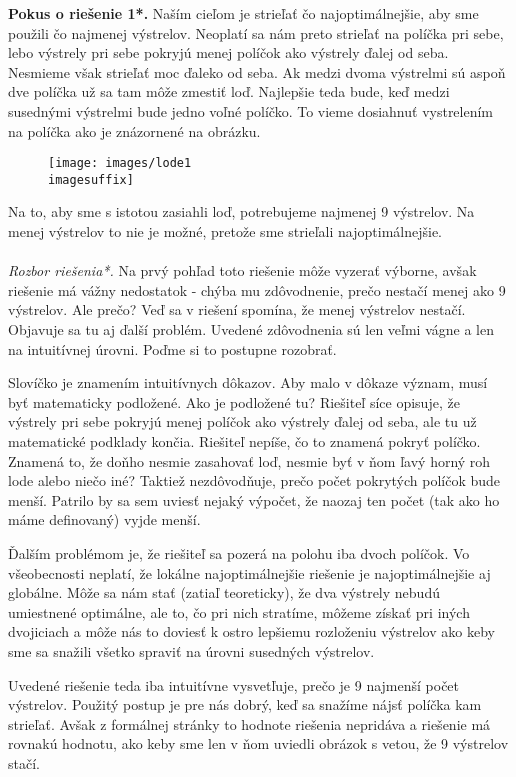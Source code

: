 {\rie
\textbf{Pokus o riešenie 1*.}
Naším cieľom je strieľať čo najoptimálnejšie, aby sme použili čo najmenej výstrelov. Neoplatí sa nám preto strieľať na políčka pri sebe, lebo výstrely pri sebe pokryjú menej políčok ako výstrely ďalej od seba. Nesmieme však strieľať moc ďaleko od seba. Ak medzi dvoma výstrelmi sú aspoň dve políčka už sa tam môže zmestiť loď. Najlepšie teda bude, keď medzi susednými výstrelmi bude jedno voľné políčko. To vieme dosiahnuť vystrelením na políčka ako je znázornené na obrázku.
\begin{figure}[h]
    \centering
    \texttt{[image: images/lode1\\imagesuffix]}
    \caption{}
    \label{fig:lode1}
\end{figure}
Na to, aby sme s istotou zasiahli loď, potrebujeme najmenej 9 výstrelov. Na menej výstrelov to nie je možné, pretože sme strieľali najoptimálnejšie.\\
\\
\textit{Rozbor riešenia*.} Na prvý pohľad toto riešenie môže vyzerať výborne, avšak riešenie má vážny nedostatok - chýba mu zdôvodnenie, prečo nestačí menej ako 9 výstrelov. Ale prečo? Veď sa v riešení spomína, že menej výstrelov nestačí. Objavuje sa tu aj ďalší problém. Uvedené zdôvodnenia sú len veľmi vágne a len na intuitívnej úrovni. Poďme si to postupne rozobrať.

 Slovíčko  je znamením intuitívnych dôkazov. Aby malo v dôkaze význam, musí byť matematicky podložené. Ako je podložené tu? Riešiteľ síce opisuje, že výstrely pri sebe pokryjú menej políčok ako výstrely ďalej od seba, ale tu už matematické podklady končia. Riešiteľ nepíše, čo to znamená pokryť políčko. Znamená to, že doňho nesmie zasahovať loď, nesmie byť v ňom ľavý horný roh lode alebo niečo iné? Taktiež nezdôvodňuje, prečo počet pokrytých políčok bude menší. Patrilo by sa sem uviesť nejaký výpočet, že naozaj ten počet (tak ako ho máme definovaný) vyjde menší.

Ďalším problémom je, že riešiteľ sa pozerá na polohu iba dvoch políčok. Vo všeobecnosti neplatí, že lokálne najoptimálnejšie riešenie je najoptimálnejšie aj globálne. Môže sa nám stať (zatiaľ teoreticky), že dva výstrely nebudú umiestnené optimálne, ale to, čo pri nich stratíme, môžeme získať pri iných dvojiciach a môže nás to doviesť k ostro lepšiemu rozloženiu výstrelov ako keby sme sa snažili všetko spraviť  na úrovni susedných výstrelov.

Uvedené riešenie teda iba intuitívne vysvetľuje, prečo je 9 najmenší počet výstrelov. Použitý postup je pre nás dobrý, keď sa snažíme nájsť políčka kam strieľať. Avšak z formálnej stránky to hodnote riešenia nepridáva a riešenie má rovnakú hodnotu, ako keby sme len v ňom uviedli obrázok s vetou, že 9 výstrelov stačí.

}
